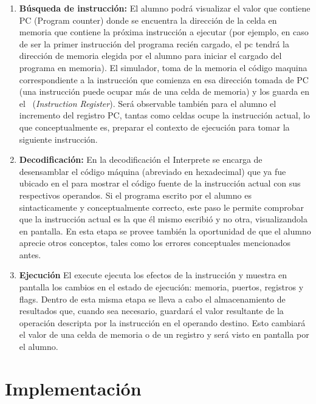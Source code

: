 \begin{enumerate}
\item \textbf{Búsqueda de instrucción:} El alumno podrá visualizar el valor que contiene PC (Program counter) donde se encuentra la dirección de la celda en memoria que contiene la próxima instrucción a ejecutar (por ejemplo, en caso de ser la primer instrucción del programa recién cargado, el pc tendrá la dirección de memoria elegida por el alumno para iniciar el cargado del programa en memoria). El simulador, toma de la memoria el código maquina correspondiente a la instrucción que comienza en esa dirección tomada de PC (una instrucción puede ocupar más de una celda de memoria) y los guarda en el \IR\ (\textit{Instruction Register}). Será observable también para el alumno el incremento del registro PC, tantas como celdas ocupe la instrucción actual, lo que conceptualmente es, preparar el contexto de ejecución para tomar la siguiente instrucción.

\item  \textbf{Decodificación:}
En la decodificación el Interprete se encarga de desensamblar el código máquina (abreviado en hexadecimal) que ya fue ubicado en el \IR para mostrar el código fuente de la instrucción actual con sus respectivos operandos. Si el programa escrito por el alumno es sintacticamente y conceptualmente correcto, este paso le permite comprobar que la instrucción actual es la que él mismo escribió y no otra, visualizandola en pantalla. En esta etapa se provee también la oportunidad de que el alumno aprecie otros conceptos, tales como los errores conceptuales mencionados antes.

\item  \textbf{Ejecución}
El execute ejecuta los efectos de la instrucción y muestra en pantalla los cambios en el estado de ejecución: memoria, puertos, registros y flags. Dentro de esta misma etapa se lleva a cabo el almacenamiento de resultados que, cuando sea necesario, guardará el valor resultante de la operación descripta por la instrucción en el operando destino. Esto cambiará el valor de una celda de memoria o de un registro y será visto en pantalla por el alumno.
\end{enumerate}


\section{Implementación}
